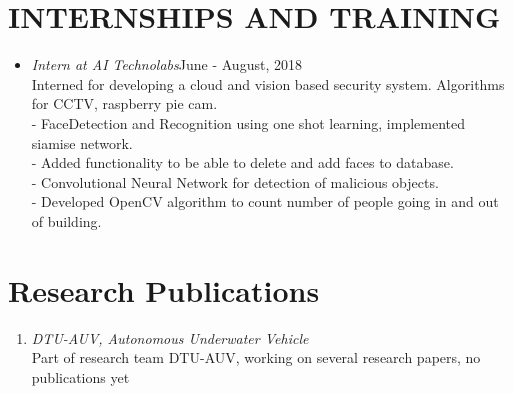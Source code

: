 \documentclass[margin]{res}
\begin{document}
\begin{resume}
\section{INTERNSHIPS AND TRAINING} \begin{itemize}
 \item{\large{\sl Intern at AI Technolabs}}\hfill June - August, 2018 \\
 	Interned for developing a cloud and vision based security system. Algorithms for CCTV, raspberry pie cam.\\
	- FaceDetection and Recognition using one shot learning, implemented siamise network.\\
	- Added functionality to be able to delete and add faces to database.\\
	- Convolutional Neural Network for detection of malicious objects.\\
	- Developed OpenCV algorithm to count number of people going in and out of building.\\
 \end{itemize}

\section{Research Publications}\begin{enumerate}
\item {\sl DTU-AUV, Autonomous Underwater Vehicle  }\\
	Part of research team DTU-AUV, working on several research papers, no publications yet

\end{enumerate}


\end{resume}
\end{document}
